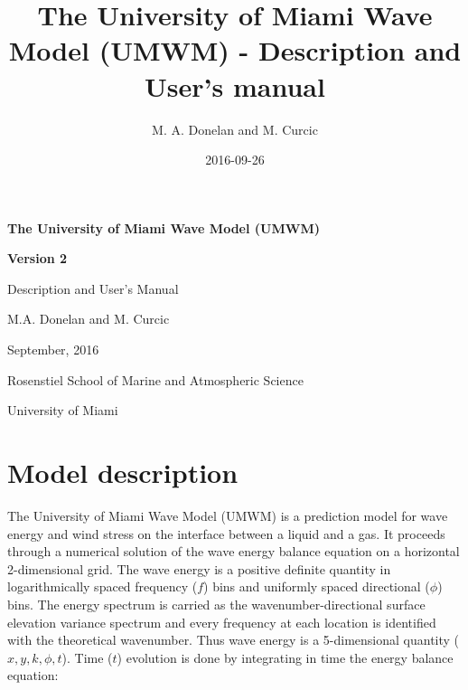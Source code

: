 \documentclass[letterpaper]{article}
\title{The University of Miami Wave Model (UMWM) - Description and User's manual}
\author{M. A. Donelan and M. Curcic}
\date{2016-09-26}
\numberwithin{equation}{section}
\begin{document}
\begin{titlepage}
\begin{center}
\vspace{5 cm}
\textbf{\large The University of Miami Wave Model (UMWM)}

\textbf{\large Version 2}

\vspace{0.5 cm}
Description and User's Manual

\vspace{1 cm}
M.A. Donelan and M. Curcic

\vspace{12 cm}
September, 2016

\vspace{0.5 cm}
Rosenstiel School of Marine and Atmospheric Science

University of Miami

\end{center}
\end{titlepage}

\newpage

\tableofcontents
\setcounter{tocdepth}{0}

\newpage

\section{Model description}
\label{sec:model_description}

The University of Miami Wave Model (UMWM) is a prediction model for wave energy and wind stress on the interface between a liquid and a gas. 
It proceeds through a numerical solution of the wave energy balance equation on a horizontal 2-dimensional grid. 
The wave energy is a positive definite quantity in logarithmically spaced frequency ($f$) bins and uniformly spaced directional ($\phi$) bins. 
The energy spectrum is carried as the wavenumber-directional surface elevation variance spectrum and every frequency at each location is identified with the theoretical wavenumber. 
Thus wave energy is a 5-dimensional quantity ($x,y,k,\phi,t$). 
Time ($t$) evolution is done by integrating in time the energy balance equation:
\end{document}
